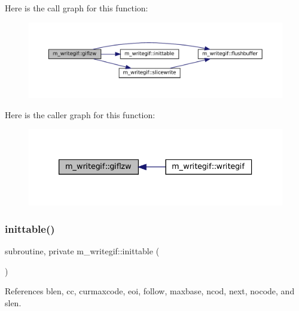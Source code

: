 Here is the call graph for this function\+:\nopagebreak
\begin{figure}[H]
\begin{center}
\leavevmode
\includegraphics[width=350pt]{namespacem__writegif_a13c09be69495f4ba21ecb7c134216a17_cgraph}
\end{center}
\end{figure}
Here is the caller graph for this function\+:\nopagebreak
\begin{figure}[H]
\begin{center}
\leavevmode
\includegraphics[width=333pt]{namespacem__writegif_a13c09be69495f4ba21ecb7c134216a17_icgraph}
\end{center}
\end{figure}
\mbox{\label{namespacem__writegif_aed61b15f90188ddf39b71aa0c73a82a8}} 
\subsubsection{\texorpdfstring{inittable()}{inittable()}}
{\footnotesize\ttfamily subroutine, private m\+\_\+writegif\+::inittable (\begin{DoxyParamCaption}{ }\end{DoxyParamCaption})\hspace{0.3cm}{\ttfamily [private]}}



References blen, cc, curmaxcode, eoi, follow, maxbase, ncod, next, nocode, and slen.

